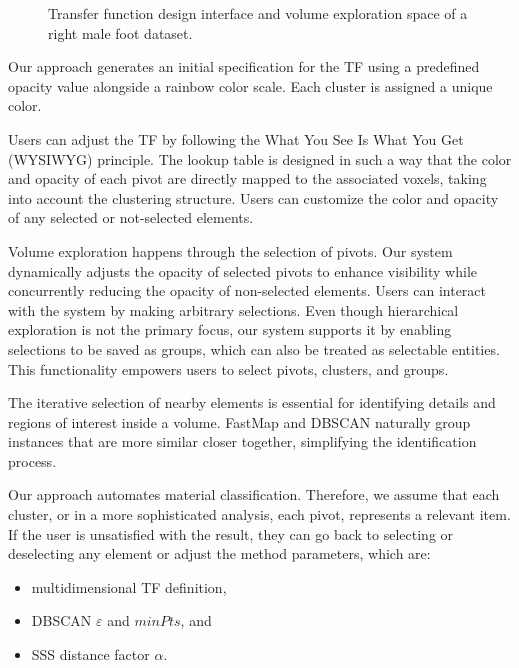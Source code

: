 \begin{figure}[htb!]
\caption{Transfer function design interface and volume exploration space of a right male foot dataset.}
    \label{fig:tf-design-example}
\end{figure}



Our approach generates an initial specification for the TF using a predefined opacity value alongside a rainbow color scale. Each cluster is assigned a unique color. 

Users can adjust the TF by following the What You See Is What You Get (WYSIWYG) principle. The lookup table is designed in such a way that the color and opacity of each pivot are directly mapped to the associated voxels, taking into account the clustering structure. Users can customize the color and opacity of any selected or not-selected elements.

Volume exploration happens through the selection of pivots. Our system dynamically adjusts the opacity of selected pivots to enhance visibility while concurrently reducing the opacity of non-selected elements. Users can interact with the system by making arbitrary selections. Even though hierarchical exploration is not the primary focus, our system supports it by enabling selections to be saved as groups, which can also be treated as selectable entities. This functionality empowers users to select pivots, clusters, and groups. 

The iterative selection of nearby elements is essential for identifying details and regions of interest inside a volume. FastMap and DBSCAN naturally group instances that are more similar closer together, simplifying the identification process.

Our approach automates material classification. Therefore, we assume that each cluster, or in a more sophisticated analysis, each pivot, represents a relevant item. If the user is unsatisfied with the result, they can go back to selecting or deselecting any element or adjust the method parameters, which are:

\begin{itemize}
    \item multidimensional TF definition,
    \item DBSCAN $\varepsilon$ and $minPts$, and
    \item SSS distance factor $\alpha$.
\end{itemize}